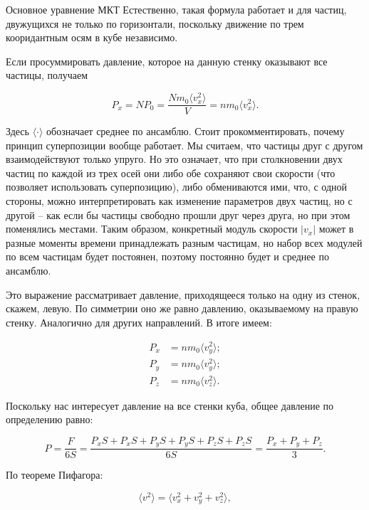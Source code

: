 \documentclass{article}
\newcommand{\abs}[1]{\lvert#1\rvert}
\begin{document}
\begin{section}{Основное уравнение МКТ}
		Естественно, такая формула работает и для частиц, двужущихся не только по горизонтали, поскольку движение по трем кооридантным осям в кубе независимо.

		Если просуммировать давление, которое на данную стенку оказывают все частицы, получаем

		\begin{equation*}
			P_x = NP_0 = \frac{N m_0 \langle v_x^2 \rangle}{V} = n m_0 \langle v_x^2 \rangle.
		\end{equation*}

		Здесь $\langle\cdot\rangle$ обозначает среднее по ансамблю. Стоит прокомментировать, почему принцип суперпозиции вообще работает. Мы считаем, что частицы друг с другом взаимодействуют только упруго. Но это означает, что при столкновении двух частиц по каждой из трех осей они либо обе сохраняют свои скорости (что позволяет использовать суперпозицию), либо обмениваются ими, что, с одной стороны, можно интерпретировать как изменение параметров двух частиц, но с другой -- как если бы частицы свободно прошли друг через друга, но при этом поменялись местами. Таким образом, конкретный модуль скорости $\abs{v_x}$ может в разные моменты времени принадлежать разным частицам, но набор всех модулей по всем частицам будет постоянен, поэтому постоянно будет и среднее по ансамблю.

		Это выражение рассматривает давление, приходящееся только на одну из стенок, скажем, левую. По симметрии оно же равно давлению, оказываемому на правую стенку. Аналогично для других направлений. В итоге имеем:

		\begin{align*}
			P_x &= n m_0 \langle v_y^2 \rangle; \\
			P_y &= n m_0 \langle v_y^2 \rangle; \\
			P_z &= n m_0 \langle v_z^2 \rangle.
		\end{align*}

		Поскольку нас интересует давление на все стенки куба, общее давление по определению равно:

		\begin{equation*}
			P = \frac{F}{6S} = \frac{P_x S + P_x S + P_y S + P_y S + P_z S + P_z S}{6S} = \frac{P_x + P_y + P_z}{3}.
		\end{equation*}

		По теореме Пифагора:

		\begin{equation*}
			\langle v^2 \rangle = \langle v_x^2 + v_y^2 + v_z^2 \rangle,
		\end{equation*}


\end{section}
\end{document}
